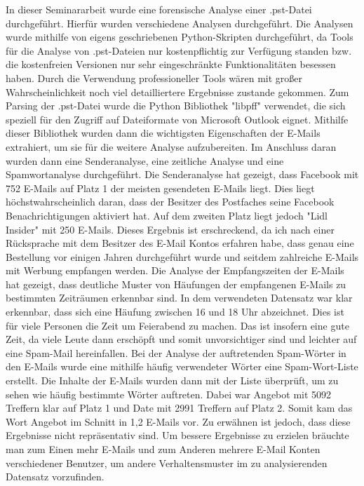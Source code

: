 In dieser Seminararbeit wurde eine forensische Analyse einer .pst-Datei durchgeführt. Hierfür wurden verschiedene Analysen durchgeführt. Die Analysen wurde mithilfe von eigens geschriebenen Python-Skripten durchgeführt, da Tools für die Analyse von .pst-Dateien nur kostenpflichtig zur Verfügung standen bzw. die kostenfreien Versionen nur sehr eingeschränkte Funktionalitäten besessen haben. Durch die Verwendung professioneller Tools wären mit großer Wahrscheinlichkeit noch viel detailliertere Ergebnisse zustande gekommen. Zum Parsing der .pst-Datei wurde die Python Bibliothek "libpff" verwendet, die sich speziell für den Zugriff auf Dateiformate von Microsoft Outlook eignet. Mithilfe dieser Bibliothek wurden dann die wichtigsten Eigenschaften der E-Mails extrahiert, um sie für die weitere Analyse aufzubereiten. \newline
Im Anschluss daran wurden dann eine Senderanalyse, eine zeitliche Analyse und eine Spamwortanalyse durchgeführt. Die Senderanalyse hat gezeigt, dass Facebook mit 752 E-Mails auf Platz 1 der meisten gesendeten E-Mails liegt. Dies liegt höchstwahrscheinlich daran, dass der Besitzer des Postfaches seine Facebook Benachrichtigungen aktiviert hat. Auf dem zweiten Platz liegt jedoch "Lidl Insider" mit 250 E-Mails. Dieses Ergebnis ist erschreckend, da ich nach einer Rücksprache mit dem Besitzer des E-Mail Kontos erfahren habe, dass genau eine Bestellung vor einigen Jahren durchgeführt wurde und seitdem zahlreiche E-Mails mit Werbung empfangen werden. Die Analyse der Empfangszeiten der E-Mails hat gezeigt, dass deutliche Muster von Häufungen der empfangenen E-Mails zu bestimmten Zeiträumen erkennbar sind. In dem verwendeten Datensatz war klar erkennbar, dass sich eine Häufung zwischen 16 und 18 Uhr abzeichnet. Dies ist für viele Personen die Zeit um Feierabend zu machen. Das ist insofern eine gute Zeit, da viele Leute dann erschöpft und somit unvorsichtiger sind und leichter auf eine Spam-Mail hereinfallen. Bei der Analyse der auftretenden Spam-Wörter in den E-Mails wurde eine mithilfe häufig verwendeter Wörter eine \glqq{}Spam-Wort-Liste\grqq{} erstellt. Die Inhalte der E-Mails wurden dann mit der Liste überprüft, um zu sehen wie häufig bestimmte Wörter auftreten. Dabei war \glqq{}Angebot\grqq{} mit 5092 Treffern klar auf Platz 1 und \glqq{}Date\grqq{} mit 2991 Treffern auf Platz 2. Somit kam das Wort Angebot im Schnitt in 1,2 E-Mails vor. \newline
Zu erwähnen ist jedoch, dass diese Ergebnisse nicht repräsentativ sind. Um bessere Ergebnisse zu erzielen bräuchte man zum Einen mehr E-Mails und zum Anderen mehrere E-Mail Konten verschiedener Benutzer, um andere Verhaltensmuster im zu analysierenden Datensatz vorzufinden.\newpage